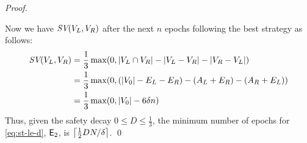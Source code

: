 \begin{proof}
\begin{center}
\end{center}
Now we have $\textit{SV}(V_L,V_R)$ after the next $n$ epochs following the best strategy as follows:
\begin{align*}
\textit{SV}(V_L,V_R) & = \frac{1}{3} \max(0, |V_L \cap V_R| - |V_L-V_R| - |V_R-V_L|) \\
& = \frac{1}{3} \max(0, (|V_0| - E_L - E_R) - (A_L+E_R) - (A_R+E_L)) \\
& = \frac{1}{3}\max(0, |V_0| - 6\delta n)
\end{align*}
Thus, given the safety decay $0 \le D \le \frac{1}{3}$, the minimum number of epochs for \eqref{eq:st-le-d}, $\mathsf{E}_2$, is $\left\lceil {\frac{1}{2}DN/\delta} \right\rceil$.
\qed
\end{proof}


